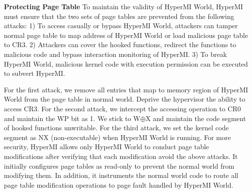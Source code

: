 \documentclass[conference]{IEEEtran}
\begin{document}
\textbf{Protecting Page Table}
To maintain the validity of HyperMI World, HyperMI must ensure that the two sets of
page tables are prevented from the following attacks:
1) To access casually or bypass HyperMI World, attackers can tamper normal page table to map address of HyperMI World or load malicious page table to CR3.
2) Attackers can cover the hooked functions, redirect the functions to malicious code and bypass interaction monitoring of HyperMI. 3) To break HyperMI World, malicious kernel code with execution permission can be executed to subvert HyperMI.

For the first attack, %
we remove all entries that map to memory region of HyperMI World from the page table in normal world. Deprive the hypervisor the ability to access CR3. %
For the second attack, we intercept the accessing operation to CR0 and maintain the WP bit as 1. We stick to W$\oplus${X} and maintain the code segment of hooked functions unwritable.
For the third attack, we set the kernel code segment as NX (non-executable) when HyperMI World is running. 
For more security, HyperMI allows only HyperMI World to conduct page table modifications after verifying
that each modification avoid the above attacks. It initially configures page tables as read-only to prevent the normal world from modifying them. In addition, it instruments the normal world code to route all page table modification operations to page fault handled by HyperMI World. 
\end{document}
